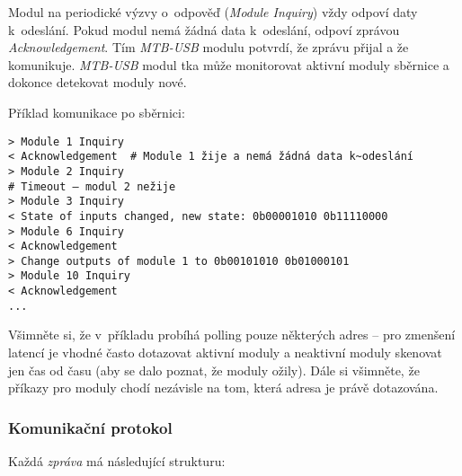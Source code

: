 Modul na periodické výzvy o~odpověď (\textit{Module Inquiry}) vždy odpoví daty
k~odeslání. Pokud modul nemá žádná data k~odeslání, odpoví zprávou
\textit{Acknowledgement}. Tím \textit{MTB-USB} modulu potvrdí, že zprávu přijal
a že komunikuje. \textit{MTB-USB} modul tka může monitorovat aktivní moduly
sběrnice a dokonce detekovat moduly nové.

Příklad komunikace po sběrnici:

\begin{verbatim}
> Module 1 Inquiry
< Acknowledgement  # Module 1 žije a nemá žádná data k~odeslání
> Module 2 Inquiry
# Timeout – modul 2 nežije
> Module 3 Inquiry
< State of inputs changed, new state: 0b00001010 0b11110000
> Module 6 Inquiry
< Acknowledgement
> Change outputs of module 1 to 0b00101010 0b01000101
> Module 10 Inquiry
< Acknowledgement
...
\end{verbatim}

Všimněte si, že v~příkladu probíhá polling pouze některých adres – pro zmenšení
latencí je vhodné často dotazovat aktivní moduly a neaktivní moduly skenovat
jen čas od času (aby se dalo poznat, že moduly ožily). Dále si všimněte, že
příkazy pro moduly chodí nezávisle na tom, která adresa je právě dotazována.

\subsubsection{Komunikační protokol} \label{subsub:mtbbus-proto-strucure}

Každá \textit{zpráva} má následující strukturu:

